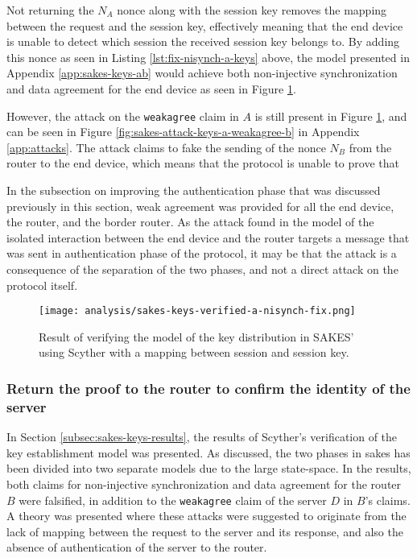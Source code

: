 Not returning the $N_A$ nonce along with the session key removes the mapping between the request and the session key, effectively meaning that the end device is unable to detect which session the received session key belongs to. By adding this nonce as seen in Listing \ref{lst:fix-nisynch-a-keys} above, the model presented in Appendix \ref{app:sakes-keys-ab} would achieve both non-injective synchronization and data agreement for the end device as seen in Figure \ref{fig:sakes-fix-verified-keys-a-nisynch}. 

However, the attack on the \texttt{weakagree} claim in $A$ is still present in Figure \ref{fig:sakes-fix-verified-keys-a-nisynch}, and can be seen in Figure \ref{fig:sakes-attack-keys-a-weakagree-b} in Appendix \ref{app:attacks}. The attack claims to fake the sending of the nonce $N_B$ from the router to the end device, which means that the protocol is unable to prove that 

In the subsection on improving the authentication phase that was discussed previously in this section, weak agreement was provided for all the end device, the router, and the border router. As the attack found in the model of the isolated interaction between the end device and the router targets a message that was sent in authentication phase of the protocol, it may be that the attack is a consequence of the separation of the two phases, and not a direct attack on the protocol itself.


\begin{figure}[H]
	\centering
	\texttt{[image: analysis/sakes-keys-verified-a-nisynch-fix.png]}
	\caption{Result of verifying the model of the key distribution in SAKES' using Scyther with a mapping between session and session key.}
	\label{fig:sakes-fix-verified-keys-a-nisynch}
\end{figure}



\subsubsection{Return the proof to the router to confirm the identity of the server}

In Section \ref{subsec:sakes-keys-results}, the results of Scyther's verification of the key establishment model was presented. As discussed, the two phases in \gls{sakes} has been divided into two separate models due to the large state-space. In the results, both claims for non-injective synchronization and data agreement for the router $B$ were falsified, in addition to the \texttt{weakagree} claim of the server $D$ in $B$'s claims. A theory was presented where these attacks were suggested to originate from the lack of mapping between the request to the server and its response, and also the absence of authentication of the server to the router.

